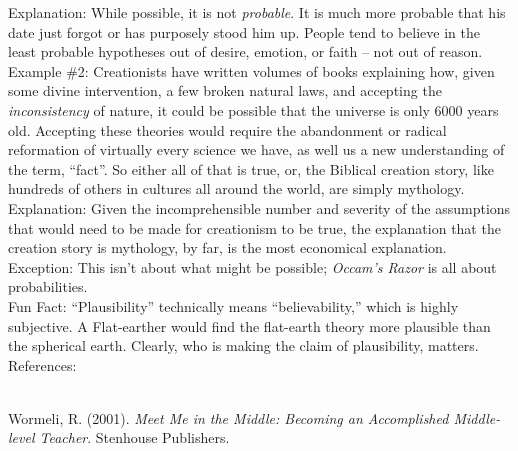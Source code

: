 \documentclass[a4paper,12pt,single,pdftex]{scrartcl}
\begin{document}
    
      Explanation: While possible, it is not {\it probable}.  It is much more probable that his date just forgot or has purposely stood him up.  People tend to believe in the least probable hypotheses out of desire, emotion, or faith -- not out of reason.
    \\

    
      Example \#2: Creationists have written volumes of books explaining how, given some divine intervention, a few broken natural laws, and accepting the {\it inconsistency} of nature, it could be possible that the universe is only 6000 years old.  Accepting these theories would require the abandonment or radical reformation of virtually every science we have, as well us a new understanding of the term, “fact”.  So either all of that is true, or, the Biblical creation story, like hundreds of others in cultures all around the world, are simply mythology.
    \\

    
      Explanation: Given the incomprehensible number and severity of the assumptions that would need to be made for creationism to be true, the explanation that the creation story is mythology, by far, is the most economical explanation.
    \\

    
      Exception: This isn't about what might be possible; {\it Occam’s Razor} is all about probabilities.
    \\

    
      Fun Fact: “Plausibility” technically means “believability,” which is highly subjective. A Flat-earther would find the flat-earth theory more plausible than the spherical earth. Clearly, who is making the claim of plausibility, matters. 
    \\

    References:

    
      
        
      \\

      
        
          Wormeli, R. (2001). {\it Meet Me in the Middle: Becoming an Accomplished Middle-level Teacher}. Stenhouse Publishers.
        
      
      
        
      \\

    
    
      
    \\
\end{document}
